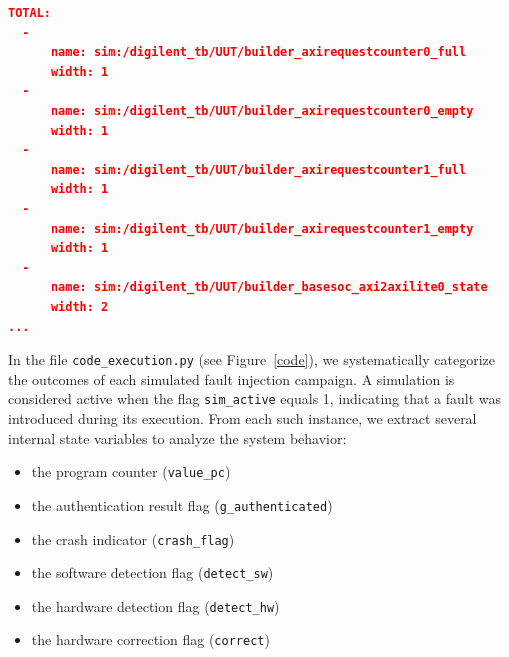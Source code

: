 \begin{lstlisting}[language=json,caption={register.yaml file},label={yaml}]
TOTAL:
  -
      name: sim:/digilent_tb/UUT/builder_axirequestcounter0_full
      width: 1
  -
      name: sim:/digilent_tb/UUT/builder_axirequestcounter0_empty
      width: 1
  -
      name: sim:/digilent_tb/UUT/builder_axirequestcounter1_full
      width: 1
  -
      name: sim:/digilent_tb/UUT/builder_axirequestcounter1_empty
      width: 1
  -
      name: sim:/digilent_tb/UUT/builder_basesoc_axi2axilite0_state
      width: 2   
...
\end{lstlisting}

In the file \texttt{code\_execution.py} (see Figure~\ref{code}), we systematically categorize the outcomes of each simulated fault injection campaign. A simulation is considered active when the flag \texttt{sim\_active} equals 1, indicating that a fault was introduced during its execution. From each such instance, we extract several internal state variables to analyze the system behavior:
\begin{itemize}
    \item the program counter (\texttt{value\_pc})
    \item the authentication result flag (\texttt{g\_authenticated})
    \item the crash indicator (\texttt{crash\_flag})
    \item the software detection flag (\texttt{detect\_sw})
    \item the hardware detection flag (\texttt{detect\_hw})
    \item the hardware correction flag (\texttt{correct})
\end{itemize}

